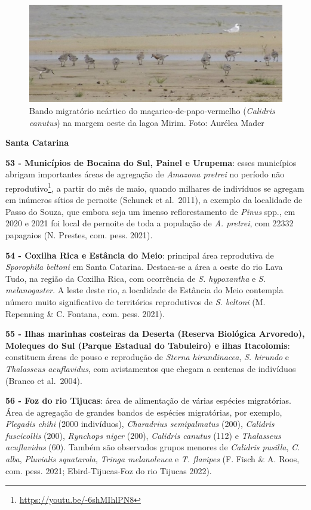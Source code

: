 \documentclass[
  oneside]{scrbook}
\DeclareRobustCommand{\href}[2]{#2\footnote{\url{#1}}}
\begin{document}
\begin{figure}[H]

{\centering \includegraphics[width=0.75\linewidth]{imagens/cap07/Figura_7.7} 

}

\caption{Bando migratório neártico do maçarico-de-papo-vermelho (\emph{Calidris canutus}) na margem oeste da lagoa Mirim. Foto: Aurélea Mader}\label{fig:27}
\end{figure}



\textbf{Santa Catarina}

\textbf{53 - Municípios de Bocaina do Sul, Painel e Urupema}: esses municípios abrigam \href{https://youtu.be/-6shMIhlPN8}{importantes áreas de agregação de \emph{Amazona pretrei} no período não reprodutivo}, a partir do mês de maio, quando milhares de indivíduos se agregam em inúmeros sítios de pernoite (Schunck et al.~2011), a exemplo da localidade de Passo do Souza, que embora seja um imenso reflorestamento de \emph{Pinus} spp., em 2020 e 2021 foi local de pernoite de toda a população de \emph{A. pretrei}, com 22332 papagaios (N. Prestes, com. pess. 2021).

\textbf{54 - Coxilha Rica e Estância do Meio}: principal área reprodutiva de \emph{Sporophila beltoni} em Santa Catarina. Destaca-se a área a oeste do rio Lava Tudo, na região da Coxilha Rica, com ocorrência de \emph{S. hypoxantha} e \emph{S. melanogaster}. A leste deste rio, a localidade de Estância do Meio contempla número muito significativo de territórios reprodutivos de \emph{S. beltoni} (M. Repenning \& C. Fontana, com. pess. 2021).

\textbf{55 - Ilhas marinhas costeiras da Deserta (Reserva Biológica Arvoredo), Moleques do Sul (Parque Estadual do Tabuleiro) e ilhas Itacolomis}: constituem áreas de pouso e reprodução de \emph{Sterna hirundinacea}, \emph{S. hirundo} e \emph{Thalasseus acuflavidus}, com avistamentos que chegam a centenas de indivíduos (Branco et al.~2004).

\textbf{56 - Foz do rio Tijucas}: área de alimentação de várias espécies migratórias. Área de agregação de grandes bandos de espécies migratórias, por exemplo, \emph{Plegadis chihi} (2000 indivíduos), \emph{Charadrius semipalmatus} (200), \emph{Calidris fuscicollis} (200), \emph{Rynchops niger} (200), \emph{Calidris canutus} (112) e \emph{Thalasseus acuflavidus} (60). Também são observados grupos menores de \emph{Calidris pusilla}, \emph{C. alba}, \emph{Pluvialis squatarola}, \emph{Tringa melanoleuca} e \emph{T. flavipes} (F. Fisch \& A. Roos, com. pess. 2021; Ebird-Tijucas-Foz do rio Tijucas 2022).
\end{document}
